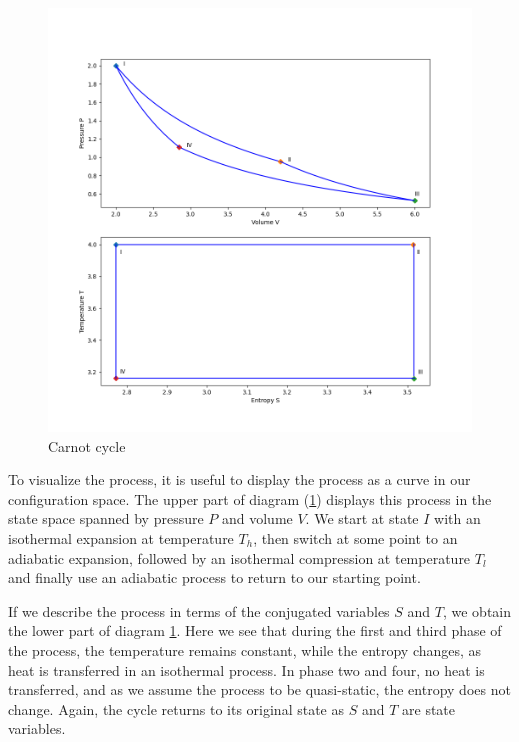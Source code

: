 \documentclass[a4paper, draft]{article}
\theoremstyle{own}
\theoremstyle{remark}
\begin{document}
\begin{figure}[ht]
	\begin{center}
	\includegraphics[scale=0.4	]{CarnotCycle}
	\caption{Carnot cycle}
	\label{fig:carnot}
	\end{center}		
\end{figure}

To visualize the process, it is useful to display the process as a curve in our configuration space. The upper part of diagram (\ref{fig:carnot}) displays this process in the state space spanned by pressure $P$ and volume $V$. We start at state $I$ with an isothermal expansion at temperature $T_h$, then switch at some point to an adiabatic expansion, followed by an isothermal compression at temperature $T_l$ and finally use an adiabatic process to return to our starting point. 


If we describe the process in terms of the conjugated variables $S$ and $T$, we obtain the lower part of diagram \ref{fig:carnot}. Here we see that during the first and third phase of the process, the temperature remains constant, while the entropy changes, as heat is transferred in an isothermal process. In phase two and four, no heat is transferred, and as we assume the process to be quasi-static, the entropy does not change. Again, the cycle returns to its original state as $S$ and $T$ are state variables.
\end{document}
